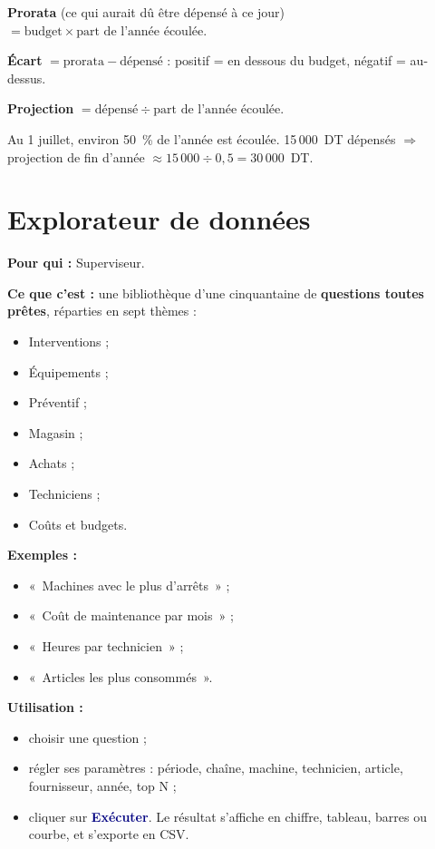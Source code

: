 \documentclass[11pt,a4paper]{article}
\newcommand{\ui}[1]{\textbf{\textcolor{navy}{#1}}}          %
\begin{document}
\begin{formule}
\textbf{Prorata} (ce qui aurait dû être dépensé à ce jour) $= \text{budget} \times \text{part de l'année écoulée}$.\par
\textbf{Écart} $= \text{prorata} - \text{dépensé}$ : positif = en dessous du budget, négatif = au-dessus.\par
\textbf{Projection} $= \text{dépensé} \div \text{part de l'année écoulée}$.
\end{formule}

\begin{exemple}
Au 1 juillet, environ 50~\% de l'année est écoulée. 15\,000~DT dépensés $\Rightarrow$ projection de fin d'année $\approx 15\,000 \div 0{,}5 = 30\,000$~DT.
\end{exemple}

\section{Explorateur de données}

\textbf{Pour qui :} Superviseur.

\textbf{Ce que c'est :} une bibliothèque d'une cinquantaine de \textbf{questions toutes prêtes}, réparties en sept thèmes :
\begin{itemize}
  \item Interventions ;
  \item Équipements ;
  \item Préventif ;
  \item Magasin ;
  \item Achats ;
  \item Techniciens ;
  \item Coûts et budgets.
\end{itemize}

\textbf{Exemples :}
\begin{itemize}
  \item «~Machines avec le plus d'arrêts~» ;
  \item «~Coût de maintenance par mois~» ;
  \item «~Heures par technicien~» ;
  \item «~Articles les plus consommés~».
\end{itemize}

\textbf{Utilisation :}
\begin{itemize}
  \item choisir une question ;
  \item régler ses paramètres : période, chaîne, machine, technicien, article, fournisseur, année, top N ;
  \item cliquer sur \ui{Exécuter}. Le résultat s'affiche en chiffre, tableau, barres ou courbe, et s'exporte en CSV.
\end{itemize}
\end{document}
